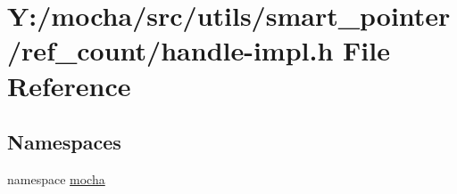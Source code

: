 \hypertarget{handle-impl_8h}{
\section{Y:/mocha/src/utils/smart\_\-pointer/ref\_\-count/handle-\/impl.h File Reference}
\label{handle-impl_8h}
}
\subsection*{Namespaces}
\begin{DoxyCompactItemize}
\item 
namespace \hyperlink{namespacemocha}{mocha}
\end{DoxyCompactItemize}
